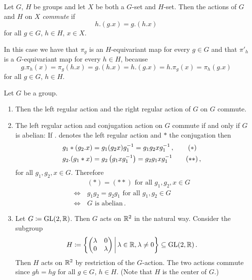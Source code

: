 \begin{definition}
  Let $G$, $H$ be groups and let $X$ be both a $G$-set and $H$-set.
  Then the actions of $G$ and $H$ on $X$ \emph{commute} if
  \[
      h.(g.x)
    = g.(h.x)
  \]
  for all $g \in G$, $h \in H$, $x \in X$.
\end{definition}


\begin{rem}
  In this case we have that $\pi_g$ is an $H$-equivariant map for every $g \in G$ and that $\pi'_h$ is a $G$-equivariant map for every $h \in H$, because
  \[
      g.\pi_h(x)
    = \pi_g(h.x)
    = g.(h.x)
    = h.(g.x)
    = h.\pi_g(x)
    = \pi_h(g.x)
  \]
  for all $g \in G$, $h \in H$.
\end{rem}


\begin{expls}
  Let $G$ be a group.
  \begin{enumerate}[label=\alph*),leftmargin=*]
    \item
      Then the left regular action and the right regular action of $G$ on $G$ commute.
    \item
      The left regular action and conjugation action on $G$ commute if and only if $G$ is abelian:
      If $.$ denotes the left regular action and $*$ the conjugation then
      \begin{align*}
            g_1*(g_2.x)
        &=  g_1 (g_2 x) g_1^{-1}
         =  g_1 g_2 x g_1^{-1} \,,
        \tag{\ensuremath{\ast}}
        \\
            g_2.(g_1*x)
        &=  g_2 \left(g_1 x g_1^{-1}\right)
         =  g_2 g_1 x g_1^{-1}
        \tag{\ensuremath{\ast\ast}} \,,
      \end{align*}
      for all $g_1, g_2, x \in G$.
      Therefore
      \begin{align*}
            &\, \text{$(\ast) = (\ast\ast)$ for all $g_1, g_2, x \in G$}  \\
        \iff&\, \text{$g_1 g_2 = g_2 g_1$ for all $g_1, g_2 \in G$}       \\
        \iff&\, \text{$G$ is abelian} \,.
      \end{align*}
    \item
      Let $G \coloneqq \operatorname{GL}(2,\mathbb{R})$.
      Then $G$ acts on $\mathbb{R}^2$ in the natural way.
      Consider the subgroup
      \[
                  H
        \coloneqq \left\{
                    \begin{pmatrix}
                      \lambda & 0       \\
                      0       & \lambda
                    \end{pmatrix}
                  \suchthat*
                    \lambda \in \R,
                    \lambda \neq 0
                  \right\}
        \subseteq \GL(2,\R) \,.
      \]
      Then $H$ acts on $\mathbb{R}^2$ by restriction of the $G$-action.
      The two actions commute since $gh = hg$ for all $g \in G$, $h \in H$.
      (Note that $H$ is the center of $G$.)
  \end{enumerate}
\end{expls}





